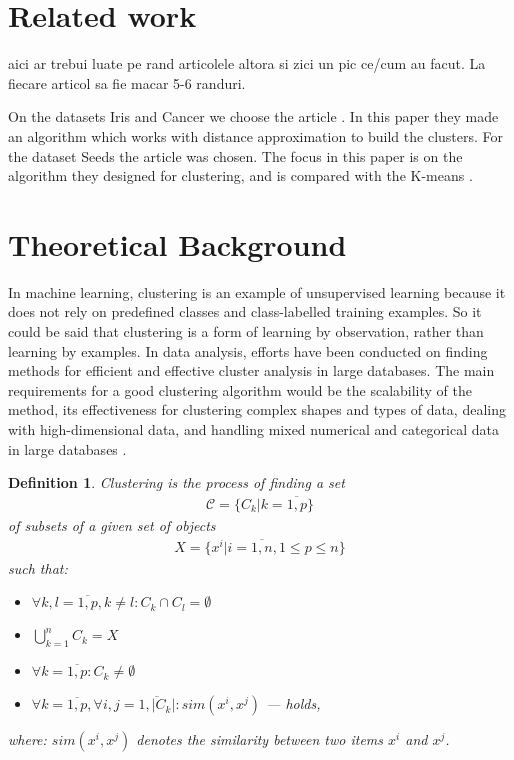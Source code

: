 \documentclass[conference]{IEEEtran}
\newcommand{\C}{\ensuremath{\mathcal C}}
\newtheorem{definition} {Definition}[section]
\begin{document}
\section{Related work}
\label{Related work}

{\color{red} aici ar trebui luate pe rand articolele altora si zici un pic ce/cum au facut. La fiecare articol sa fie macar 5-6 randuri. }

On the datasets Iris \cite{website:iris} and Cancer \cite{website:breastcancer} we choose the article \cite{cannon0approximate}. In this paper they made an algorithm which works with distance approximation to build the clusters. For the dataset Seeds \cite{website:seeds} the article \cite{CompleteGradientClusteringAlgorithm} was chosen. The focus in this paper is on the algorithm they designed for clustering, and is compared with the K-means \cite{website:kmeans}.

\section{Theoretical Background}
\label{Theoretical Background}

In machine learning, clustering is an example of unsupervised learning because it does not rely on predefined classes and class-labelled training examples. So it could be said that clustering is a form of learning by observation, rather than learning by examples. In data analysis, efforts have been conducted on finding methods for efficient and effective cluster analysis in large databases. The main requirements for a good clustering algorithm would be the scalability of the method, its effectiveness for clustering complex shapes and types of data, dealing with high-dimensional data, and handling mixed numerical and categorical data in large databases \cite{Han06DataMining}.



\begin{definition}
\label{def:clustering}
Clustering is the process of finding a set
\begin{align}
\C=\{ C_{k} \vert k=\overline{1,p} \}
\end{align}
of subsets of a given set of objects
\begin{align}
 X = \{ x^{i} \vert
 i = \overline{1,n}, 1 \leq p \leq n \}
\end{align}
 such that:
 \begin{itemize}
	\item $\forall k,l = \overline{1,p}, k \neq l: C_{k} \cap C_{l} = \emptyset$
	\item $\bigcup_{k=1}^{n} C_{k} = X $
	\item $\forall k = \overline{1,p}: C_{k} \neq \emptyset $
	\item $\forall k = \overline{1,p}, \forall i,j = \overline{1, \vert C_{k} \vert}: sim(x^{i},x^{j})$ --- holds,
 \end{itemize}
 where: $sim(x^{i},x^{j})$ denotes the similarity between two items $x^{i}$ and $x^{j}$.
\end{definition}
\end{document}
